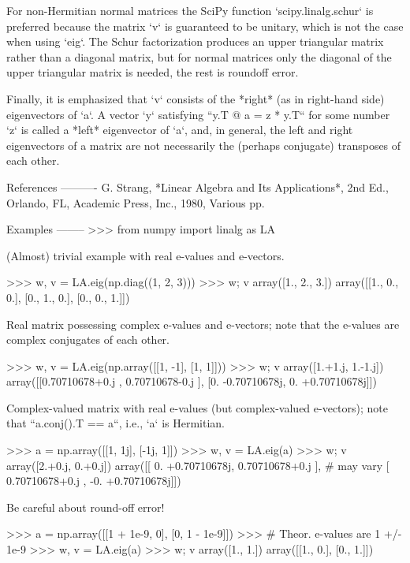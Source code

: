 \begin{DoxyVerb}
For non-Hermitian normal matrices the SciPy function `scipy.linalg.schur`
is preferred because the matrix `v` is guaranteed to be unitary, which is
not the case when using `eig`. The Schur factorization produces an
upper triangular matrix rather than a diagonal matrix, but for normal
matrices only the diagonal of the upper triangular matrix is needed, the
rest is roundoff error.

Finally, it is emphasized that `v` consists of the *right* (as in
right-hand side) eigenvectors of `a`.  A vector `y` satisfying
``y.T @ a = z * y.T`` for some number `z` is called a *left*
eigenvector of `a`, and, in general, the left and right eigenvectors
of a matrix are not necessarily the (perhaps conjugate) transposes
of each other.

References
----------
G. Strang, *Linear Algebra and Its Applications*, 2nd Ed., Orlando, FL,
Academic Press, Inc., 1980, Various pp.

Examples
--------
>>> from numpy import linalg as LA

(Almost) trivial example with real e-values and e-vectors.

>>> w, v = LA.eig(np.diag((1, 2, 3)))
>>> w; v
array([1., 2., 3.])
array([[1., 0., 0.],
       [0., 1., 0.],
       [0., 0., 1.]])

Real matrix possessing complex e-values and e-vectors; note that the
e-values are complex conjugates of each other.

>>> w, v = LA.eig(np.array([[1, -1], [1, 1]]))
>>> w; v
array([1.+1.j, 1.-1.j])
array([[0.70710678+0.j        , 0.70710678-0.j        ],
       [0.        -0.70710678j, 0.        +0.70710678j]])

Complex-valued matrix with real e-values (but complex-valued e-vectors);
note that ``a.conj().T == a``, i.e., `a` is Hermitian.

>>> a = np.array([[1, 1j], [-1j, 1]])
>>> w, v = LA.eig(a)
>>> w; v
array([2.+0.j, 0.+0.j])
array([[ 0.        +0.70710678j,  0.70710678+0.j        ], # may vary
       [ 0.70710678+0.j        , -0.        +0.70710678j]])

Be careful about round-off error!

>>> a = np.array([[1 + 1e-9, 0], [0, 1 - 1e-9]])
>>> # Theor. e-values are 1 +/- 1e-9
>>> w, v = LA.eig(a)
>>> w; v
array([1., 1.])
array([[1., 0.],
       [0., 1.]])\end{DoxyVerb}
 \mbox{\label{namespacenumpy_1_1linalg_1_1linalg_ab456be2ee37456d804229d08f0666927}} 
